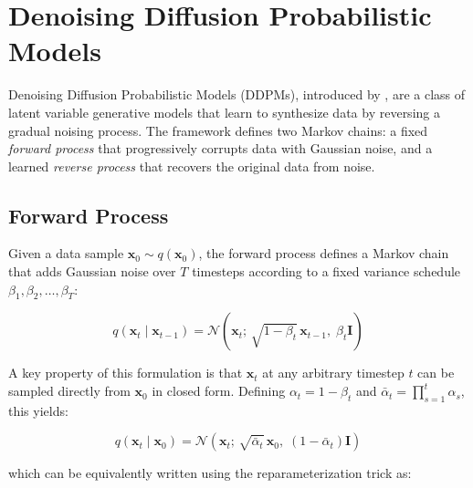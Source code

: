 \documentclass{article}
\begin{document}
\nocite{*}
\printbibliography

\newpage
\appendix


\section{Denoising Diffusion Probabilistic Models}

Denoising Diffusion Probabilistic Models (DDPMs), introduced by \citet{ho2020denoising},
are a class of latent variable generative models that learn to synthesize data by reversing
a gradual noising process. The framework defines two Markov chains: a fixed \textit{forward
process} that progressively corrupts data with Gaussian noise, and a learned \textit{reverse
process} that recovers the original data from noise.

\subsection{Forward Process}

Given a data sample $\mathbf{x}_0 \sim q(\mathbf{x}_0)$, the forward process defines a
Markov chain that adds Gaussian noise over $T$ timesteps according to a fixed variance
schedule $\beta_1, \beta_2, \ldots, \beta_T$:

\begin{equation}
    q(\mathbf{x}_t \mid \mathbf{x}_{t-1}) = \mathcal{N}\!\left(\mathbf{x}_t;\,
    \sqrt{1 - \beta_t}\,\mathbf{x}_{t-1},\; \beta_t \mathbf{I}\right)
\end{equation}

\noindent A key property of this formulation is that $\mathbf{x}_t$ at any arbitrary
timestep $t$ can be sampled directly from $\mathbf{x}_0$ in closed form. Defining
$\alpha_t = 1 - \beta_t$ and $\bar{\alpha}_t = \prod_{s=1}^{t} \alpha_s$, this yields:

\begin{equation}
    q(\mathbf{x}_t \mid \mathbf{x}_0) = \mathcal{N}\!\left(\mathbf{x}_t;\,
    \sqrt{\bar{\alpha}_t}\,\mathbf{x}_0,\;(1 - \bar{\alpha}_t)\mathbf{I}\right)
\end{equation}

\noindent which can be equivalently written using the reparameterization trick as:
\end{document}
